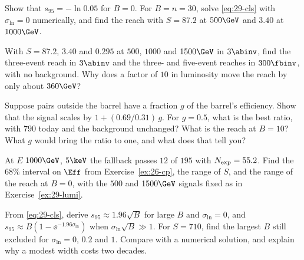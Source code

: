 \begin{exercises}
  \item\label{ex:29-point} Show that $s_{95}=-\ln0.05$ for $B=0$. For $B=n=30$, solve \eqref{eq:29-cls} with $\sigma_{\ln}=0$ numerically, and find the reach with $S=87.2$ at $500\GeV$ and $3.40$ at $1000\GeV$.
  \item\label{ex:29-lumi} With $S=87.2$, $3.40$ and $0.295$ at $500$, $1000$ and $1500\GeV$ in $3\abinv$, find the three-event reach in $3\abinv$ and the three- and five-event reaches in $300\fbinv$, with no background. Why does a factor of $10$ in luminosity move the reach by only about $360\GeV$?
  \item\label{ex:29-endcap} Suppose pairs outside the barrel have a fraction $g$ of the barrel's efficiency. Show that the signal scales by $1+(0.69/0.31)\,g$. For $g=0.5$, what is the best ratio, with $790$ today and the background unchanged? What is the reach at $B=10$? What $g$ would bring the ratio to one, and what does that tell you?
  \item\label{ex:29-stat} At $E$ $1000\GeV$, $5\keV$ the fallback passes $12$ of $195$ with $N_{\rm exp}=55.2$. Find the $68\%$ interval on $\Eff$ from Exercise~\ref{ex:26-cp}, the range of $S$, and the range of the reach at $B=0$, with the $500$ and $1500\GeV$ signals fixed as in Exercise~\ref{ex:29-lumi}.
  \item\label{ex:29-limits} From \eqref{eq:29-cls}, derive $s_{95}\approx1.96\sqrt B$ for large $B$ and $\sigma_{\ln}=0$, and $s_{95}\approx B(1-\ee^{-1.96\sigma_{\ln}})$ when $\sigma_{\ln}\sqrt B\gg1$. For $S=710$, find the largest $B$ still excluded for $\sigma_{\ln}=0$, $0.2$ and $1$. Compare with a numerical solution, and explain why a modest width costs two decades.
\end{exercises}
